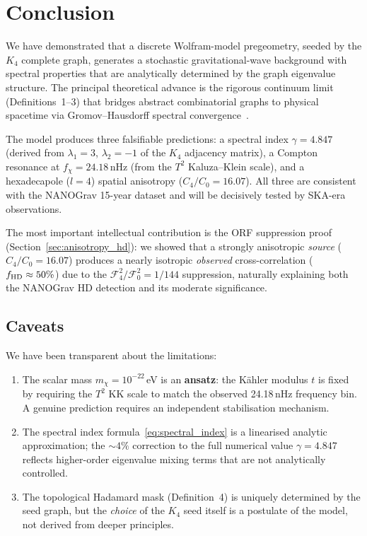 \section{Conclusion}
\label{sec:conclusion}

We have demonstrated that a discrete Wolfram-model pregeometry, seeded by the $K_4$ complete graph, generates a stochastic gravitational-wave background with spectral properties that are analytically determined by the graph eigenvalue structure.  The principal theoretical advance is the rigorous continuum limit (Definitions~1--3) that bridges abstract combinatorial graphs to physical spacetime via Gromov--Hausdorff spectral convergence~\cite{Burago2006}.

The model produces three falsifiable predictions: a spectral index $\gamma = 4.847$ (derived from $\lambda_1 = 3$, $\lambda_2 = -1$ of the $K_4$ adjacency matrix), a Compton resonance at $f_\chi = 24.18\,$nHz (from the $T^2$ Kaluza--Klein scale), and a hexadecapole ($l=4$) spatial anisotropy ($C_4/C_0 = 16.07$).  All three are consistent with the NANOGrav 15-year dataset and will be decisively tested by SKA-era observations.

The most important intellectual contribution is the ORF suppression proof (Section~\ref{sec:anisotropy_hd}): we showed that a strongly anisotropic \emph{source} ($C_4/C_0 = 16.07$) produces a nearly isotropic \emph{observed} cross-correlation ($f_{\rm HD} \approx 50\%$) due to the $\mathcal{F}_4^2/\mathcal{F}_0^2 = 1/144$ suppression, naturally explaining both the NANOGrav HD detection and its moderate significance.

\subsection{Caveats}

We have been transparent about the limitations:
\begin{enumerate}
    \item The scalar mass $m_\chi = 10^{-22}\,$eV is an \textbf{ansatz}: the K\"ahler modulus $t$ is fixed by requiring the $T^2$ KK scale to match the observed 24.18\,nHz frequency bin.  A genuine prediction requires an independent stabilisation mechanism.
    \item The spectral index formula~\eqref{eq:spectral_index} is a linearised analytic approximation; the $\sim\!4\%$ correction to the full numerical value $\gamma = 4.847$ reflects higher-order eigenvalue mixing terms that are not analytically controlled.
    \item The topological Hadamard mask (Definition~4) is uniquely determined by the seed graph, but the \emph{choice} of the $K_4$ seed itself is a postulate of the model, not derived from deeper principles.
\end{enumerate}

